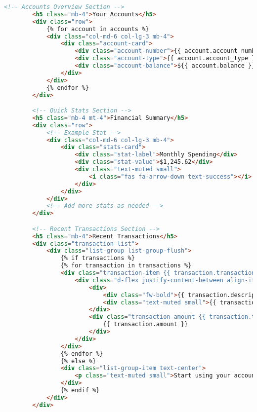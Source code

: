 \begin{lstlisting}[language=HTML]
        <!-- Accounts Overview Section -->
        <h5 class="mb-4">Your Accounts</h5>
        <div class="row">
            {% for account in accounts %}
            <div class="col-md-6 col-lg-3 mb-4">
                <div class="account-card">
                    <div class="account-number">{{ account.account_number }}</div>
                    <div class="account-type">{{ account.account_type }}</div>
                    <div class="account-balance">${{ account.balance }}</div>
                </div>
            </div>
            {% endfor %}
        </div>

        <!-- Quick Stats Section -->
        <h5 class="mb-4 mt-4">Financial Summary</h5>
        <div class="row">
            <!-- Example Stat -->
            <div class="col-md-6 col-lg-3 mb-4">
                <div class="stats-card">
                    <div class="stat-label">Monthly Spending</div>
                    <div class="stat-value">$1,245.62</div>
                    <div class="text-muted small">
                        <i class="fas fa-arrow-down text-success"></i> 12% from last month
                    </div>
                </div>
            </div>
            <!-- Add more stats as needed -->
        </div>

        <!-- Recent Transactions Section -->
        <h5 class="mb-4">Recent Transactions</h5>
        <div class="transaction-list">
            <div class="list-group list-group-flush">
                {% if transactions %}
                {% for transaction in transactions %}
                <div class="transaction-item {{ transaction.transaction_type }}">
                    <div class="d-flex justify-content-between align-items-center">
                        <div>
                            <div class="fw-bold">{{ transaction.description }}</div>
                            <div class="text-muted small">{{ transaction.timestamp }}</div>
                        </div>
                        <div class="transaction-amount {{ transaction.transaction_type }}">
                            {{ transaction.amount }}
                        </div>
                    </div>
                </div>
                {% endfor %}
                {% else %}
                <div class="list-group-item text-center">
                    <p class="text-muted small">Start using your account to see transactions here.</p>
                </div>
                {% endif %}
            </div>
        </div>


\end{lstlisting}
